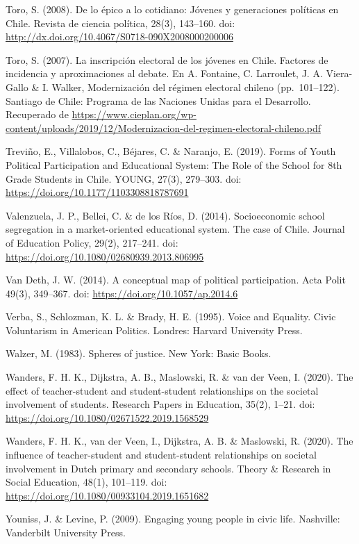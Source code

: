 \documentclass[12pt,twoside]{templates/facsothesis}
\begin{document}
Toro, S. (2008). De lo épico a lo cotidiano: Jóvenes y generaciones políticas en Chile. Revista de ciencia política, 28(3), 143--160. doi: \url{http://dx.doi.org/10.4067/S0718-090X2008000200006}

Toro, S. (2007). La inscripción electoral de los jóvenes en Chile. Factores de incidencia y aproximaciones al debate. En A. Fontaine, C. Larroulet, J. A. Viera-Gallo \& I. Walker, Modernización del régimen electoral chileno (pp.~101--122). Santiago de Chile: Programa de las Naciones Unidas para el Desarrollo. Recuperado de \url{https://www.cieplan.org/wp-content/uploads/2019/12/Modernizacion-del-regimen-electoral-chileno.pdf}

Treviño, E., Villalobos, C., Béjares, C. \& Naranjo, E. (2019). Forms of Youth Political Participation and Educational System: The Role of the School for 8th Grade Students in Chile. YOUNG, 27(3), 279--303. doi: \url{https://doi.org/10.1177/1103308818787691}

Valenzuela, J. P., Bellei, C. \& de los Ríos, D. (2014). Socioeconomic school segregation in a market-oriented educational system. The case of Chile. Journal of Education Policy, 29(2), 217--241. doi: \url{https://doi.org/10.1080/02680939.2013.806995}

Van Deth, J. W. (2014). A conceptual map of political participation. Acta Polit 49(3), 349--367. doi: \url{https://doi.org/10.1057/ap.2014.6}

Verba, S., Schlozman, K. L. \& Brady, H. E. (1995). Voice and Equality. Civic Voluntarism in American Politics. Londres: Harvard University Press.

Walzer, M. (1983). Spheres of justice. New York: Basic Books.

Wanders, F. H. K., Dijkstra, A. B., Maslowski, R. \& van der Veen, I. (2020). The effect of teacher-student and student-student relationships on the societal involvement of students. Research Papers in Education, 35(2), 1--21. doi: \url{https://doi.org/10.1080/02671522.2019.1568529}

Wanders, F. H. K., van der Veen, I., Dijkstra, A. B. \& Maslowski, R. (2020). The influence of teacher-student and student-student relationships on societal involvement in Dutch primary and secondary schools. Theory \& Research in Social Education, 48(1), 101--119. doi: \url{https://doi.org/10.1080/00933104.2019.1651682}

Youniss, J. \& Levine, P. (2009). Engaging young people in civic life. Nashville: Vanderbilt University Press.
\end{document}
